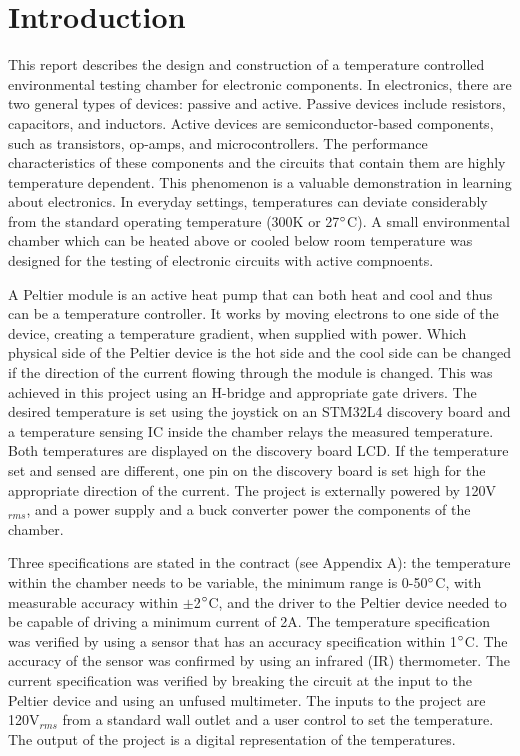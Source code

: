 \documentclass[11pt,letter]{article}
\begin{document}
\newpage %
\tableofcontents

\newpage
\listoffigures

\newpage 
\clearpage



\section{Introduction}
This report describes the design and construction of a temperature controlled environmental testing chamber for electronic components. In electronics, there are two general types of devices: passive and active. Passive devices include resistors, capacitors, and inductors. Active devices are semiconductor-based components, such as transistors, op-amps, and microcontrollers. The performance characteristics of these components and the circuits that contain them are highly temperature dependent. This phenomenon is a valuable demonstration in learning about electronics. In everyday settings, temperatures can deviate considerably from the standard operating temperature (300K or 27$\degree$C). A small environmental chamber which can be heated above or cooled below room temperature was designed for the testing of electronic circuits with active compnoents. 

A Peltier module is an active heat pump that can both heat and cool and thus can be a temperature controller. It works by moving electrons to one side of the device, creating a temperature gradient, when supplied with power. Which physical side of the Peltier device is the hot side and the cool side can be changed if the direction of the current flowing through the module is changed. This was achieved in this project using an H-bridge and appropriate gate drivers. The desired temperature is set using the joystick on an STM32L4 discovery board and a temperature sensing IC inside the chamber relays the measured temperature. Both temperatures are displayed on the discovery board LCD. If the temperature set and sensed are different, one pin on the discovery board is set high for the appropriate direction of the current. The project is externally powered by 120V$_{rms}$, and a power supply and a buck converter power the components of the chamber.  

Three specifications are stated in the contract (see Appendix A): the temperature within the chamber needs to be variable, the minimum range is 0-50$\degree$C, with measurable accuracy within $\pm$2$\degree$C, and the driver to the Peltier device needed to be capable of driving a minimum current of 2A. The temperature specification was verified by using a sensor that has an accuracy specification within 1$\degree$C. The accuracy of the sensor was confirmed by using an infrared (IR) thermometer. The current specification was verified by breaking the circuit at the input to the Peltier device and using an unfused multimeter. The inputs to the project are 120V$_{rms}$ from a standard wall outlet and a user control to set the temperature. The output of the project is a digital representation of the temperatures.   
\end{document}
